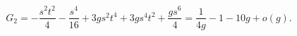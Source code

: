 \begin{equation}\label{planar1}
    G_2=-\frac{s^2t^2}{4}-\frac{s^4}{16}+3gs^2t^4+3gs^4t^2+\frac{gs^6}{4}=\frac{1}{4g}-1-10g+o(g).
\end{equation}

